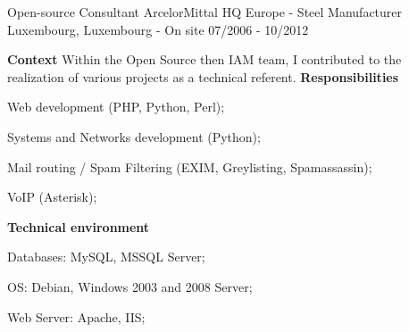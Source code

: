 \begin{cventries}
  \cventry
    {Open-source Consultant} %
    {ArcelorMittal HQ Europe - Steel Manufacturer} %
    {Luxembourg, Luxembourg - On site} %
    {07/2006 - 10/2012} %
    {
      \textbf{Context}
      \newline
      Within the Open Source then IAM team, I contributed to the realization of various projects as a technical referent.
      \newline \vspace{2pt}
      \textbf{Responsibilities}
      \newline \vspace{12pt}
      \begin{cvitems}
        \item {Web development (PHP, Python, Perl);}
        \item {Systems and Networks development (Python);}
        \item {Mail routing / Spam Filtering (EXIM, Greylisting, Spamassassin);}
        \item {VoIP (Asterisk);}
      \end{cvitems}
      \textbf{Technical environment}
      \newline \vspace{12pt}
      \begin{cvitems}
        \item {Databases: MySQL, MSSQL Server;}
        \item {OS: Debian, Windows 2003 and 2008 Server;}
        \item {Web Server: Apache, IIS;}
      \end{cvitems}
    }


\end{cventries}
